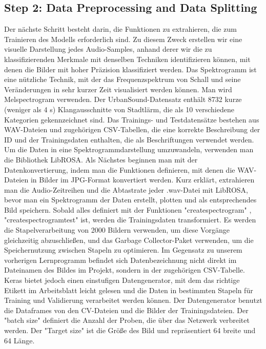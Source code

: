 \documentclass[a4paper,11pt]{article}
\theoremstyle{mytheor}
\begin{document}
\subsection{Step 2: Data Preprocessing and Data Splitting}
Der nächste Schritt besteht darin, die Funktionen zu extrahieren, die zum Trainieren des Modells erforderlich sind. Zu diesem Zweck erstellen wir eine visuelle Darstellung jedes Audio-Samples, anhand derer wir die zu klassifizierenden Merkmale mit denselben Techniken identifizieren können, mit denen die Bilder mit hoher Präzision klassifiziert werden.
Das Spektrogramm ist eine nützliche Technik, mit der das Frequenzspektrum von Schall und seine Veränderungen in sehr kurzer Zeit visualisiert werden können. Man wird Melspectrogram verwenden.
Der UrbanSound-Datensatz enthält 8732 kurze (weniger als 4 s) Klangausschnitte von Stadtlärm, die als 10 verschiedene Kategorien gekennzeichnet sind. Das Trainings- und Testdatensätze bestehen aus WAV-Dateien und zugehörigen CSV-Tabellen, die eine korrekte Beschreibung der ID und der Trainingsdaten enthalten, die als Beschriftungen verwendet werden. Um die Daten in eine Spektrogrammdarstellung umzuwandeln, verwenden man die Bibliothek LibROSA. Als Nächstes beginnen man mit der Datenkonvertierung, indem man die Funktionen definieren, mit denen die WAV-Dateien in Bilder im JPG-Format konvertiert werden. Kurz erklärt, extrahieren man die Audio-Zeitreihen und die Abtastrate jeder .wav-Datei mit LibROSA, bevor man ein Spektrogramm der Daten erstellt, plotten und als entsprechendes Bild speichern. 
Sobald alles definiert mit der Funktionen "create\textunderscore spectrogram" 
, "create\textunderscore spectrogram\textunderscore test" ist, werden die Trainingsdaten transformiert. 
Es werden die Stapelverarbeitung von 2000 Bildern verwenden, um diese Vorgänge gleichzeitig abzuschließen, und das Garbage Collector-Paket verwenden, um die Speichernutzung zwischen Stapeln zu optimieren.
Im Gegensatz zu unserem vorherigen Lernprogramm befindet sich Datenbezeichnung nicht direkt im Dateinamen des Bildes im Projekt, sondern in der zugehörigen CSV-Tabelle. Keras bietet jedoch einen einstufigen Datengenerator, mit dem das richtige Etikett im Arbeitsblatt leicht gelesen und die Daten in bestimmten Stapeln für Training und Validierung verarbeitet werden können. Der Datengenerator benutzt die Dataframes von den CV-Dateien und die Bilder der Trainingsdateien. Der "batch size" definiert die Anzahl der Proben, die über das Netzwerk verbreitet werden. Der "Target size" ist die Größe des Bild und repräsentiert 64 breite und 64 Länge.
\end{document}
